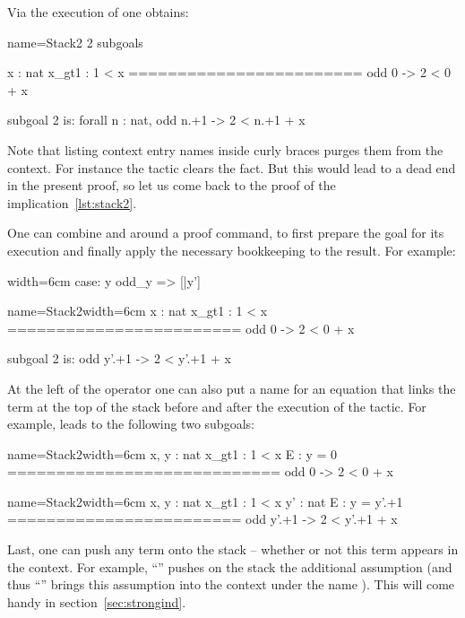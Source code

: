 Via the execution of  one obtains:

\begin{coqout}{name=Stack2}{}
2 subgoals

  x : nat
  x_gt1 : 1 < x
  ========================
   odd 0 -> 2 < 0 + x

subgoal 2 is:
 forall n : nat, odd n.+1 -> 2 < n.+1 + x
\end{coqout}

Note that listing context entry names inside curly braces purges them
from the context. For instance the tactic 
clears the  fact. But this would lead to a dead end in the
present proof, so let us come back to the proof of the
implication~\ref{lst:stack2}.


One can combine \C{:} and \C{=>} around a proof command, to first prepare the
goal for its execution and finally apply the necessary bookkeeping to the
result.  For example:

\begin{coq-left}{}{width=6cm}
case: y odd_y => [|y']
$~$
$~$
$~$
$~$
$~$
$~$
\end{coq-left}
\begin{coqout-right}{name=Stack2}{width=6cm}
  x : nat
  x_gt1 : 1 < x
  ========================
   odd 0 -> 2 < 0 + x

subgoal 2 is:
 odd y'.+1 -> 2 < y'.+1 + x
\end{coqout-right}

At the left of the \C{:} operator one can also put a name for an
equation that links the term at the top of the stack before and
after the execution of the tactic. For example,
  leads to
the following two subgoals:

\begin{coqout}{name=Stack2}{width=6cm}
 x, y : nat
 x_gt1 : 1 < x
 E : y = 0
============================
 odd 0 -> 2 < 0 + x
\end{coqout}
\begin{coqout}{name=Stack2}{width=6cm}
 x, y : nat
 x_gt1 : 1 < x
 y' : nat
 E : y = y'.+1
========================
 odd y'.+1 -> 2 < y'.+1 + x
\end{coqout}

Last, one can push any term onto the stack -- whether or not this
term appears in the context. For example,
``'' pushes on the stack
the additional assumption  (and thus
``'' brings this assumption into the context
under the name ). This
will come handy in section~\ref{sec:strongind}.

